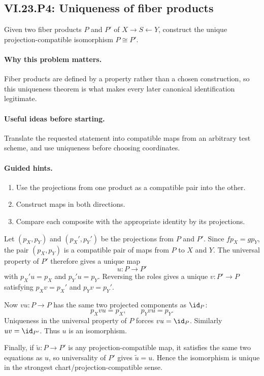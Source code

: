 \subsection*{VI.23.P4: Uniqueness of fiber products}
\begin{problem}\label{prob:vi23-p04}
Given two fiber products $P$ and $P'$ of $X\to S\leftarrow Y$, construct the unique projection-compatible isomorphism $P\cong P'$.
\end{problem}

\ifdefined\FullProblemDossiers
\paragraph{Why this problem matters.}
Fiber products are defined by a property rather than a chosen construction, so this uniqueness theorem is what makes every later canonical identification legitimate.

\paragraph{Useful ideas before starting.}
Translate the requested statement into compatible maps from an arbitrary test scheme, and use uniqueness before choosing coordinates.

\paragraph{Guided hints.}
\begin{enumerate}
\item Use the projections from one product as a compatible pair into the other.
\item Construct maps in both directions.
\item Compare each composite with the appropriate identity by its projections.
\end{enumerate}

\begin{solution}
Let $(p_X,p_Y)$ and $(p_X',p_Y')$ be the projections from $P$ and $P'$.  Since
$f p_X=g p_Y$, the pair $(p_X,p_Y)$ is a compatible pair of maps from $P$ to $X$ and $Y$.
The universal property of $P'$ therefore gives a unique map
\[
u:P\to P'
\]
with $p_X'u=p_X$ and $p_Y'u=p_Y$.  Reversing the roles gives a unique
$v:P'\to P$ satisfying $p_Xv=p_X'$ and $p_Yv=p_Y'$.

Now $vu:P\to P$ has the same two projected components as $\id_P$:
\[
p_Xvu=p_X,\qquad p_Yvu=p_Y.
\]
Uniqueness in the universal property of $P$ forces $vu=\id_P$.  Similarly $uv=\id_{P'}$.
Thus $u$ is an isomorphism.

Finally, if $\tilde u:P\to P'$ is any projection-compatible map, it satisfies the same two
equations as $u$, so universality of $P'$ gives $\tilde u=u$.  Hence the isomorphism is unique
in the strongest chart/projection-compatible sense.
\end{solution}


